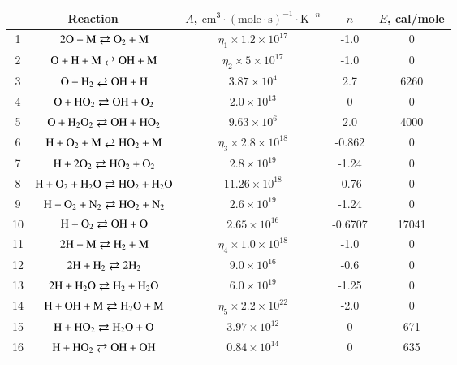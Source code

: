 \documentclass{warpdoc}
\renewcommand{\fontsizetable}{\footnotesize\scalefont{0.9}}
\begin{document}
%
\begin{table}[ht]
\fontsizetable
\begin{center}
\begin{threeparttable}
\begin{tabular}{ccccc} 
\toprule
\multicolumn{2}{c}{Reaction} & $A$, $\textrm{cm}^3\cdot(\textrm{mole}\cdot \textrm{s})^{-1}\cdot \textrm{K}^{-n}$ & $n$ & $E$, cal/mole  \\ 
\midrule
    1 & $\rm 2O + M \rightleftarrows  O_2 + M$&$ \eta_1 \times 1.2 \times 10^{17}$& -1.0 &  0\\
    2 & $\rm O +  H + M \rightleftarrows  OH + M$  & $ \eta_2 \times 5 \times 10^{17} $& -1.0 &  0\\
    3& $\rm O +  H_2  \rightleftarrows  OH + H$  & $ 3.87 \times 10^{4} $& 2.7 & 6260 \\
    4 & $\rm O +  HO_2  \rightleftarrows  OH + O_2$  & $ 2.0 \times 10^{13} $& 0 & 0 \\
    5 & $\rm O +  H_2O_2  \rightleftarrows  OH + HO_2$  & $ 9.63 \times 10^{6} $& 2.0 & 4000  \\
    6 & $\rm H + O_2 + M  \rightleftarrows  HO_2 + M$  & $ \eta_3 \times 2.8 \times 10^{18} $& -0.862 & 0 \\
    7 & $\rm H + 2O_2  \rightleftarrows  HO_2 + O_2$  & $ 2.8 \times 10^{19} $& -1.24 & 0 \\
    8 & $\rm H + O_2 + H_2O  \rightleftarrows  HO_2 + H_2O$  & $ 11.26 \times 10^{18} $& -0.76 & 0 \\
    9 & $\rm H + O_2 + N_2  \rightleftarrows  HO_2 + N_2$  & $ 2.6 \times 10^{19} $& -1.24 & 0 \\
    10 & $\rm H + O_2 \rightleftarrows  OH + O$  & $ 2.65 \times 10^{16} $& -0.6707 & 17041 \\
    11 & $\rm 2H + M \rightleftarrows  H_2 + M$  & $ \eta_4 \times 1.0 \times 10^{18} $& -1.0 & 0 \\
    12 & $\rm 2H + H_2 \rightleftarrows  2H_2 $  & $ 9.0 \times 10^{16} $& -0.6 & 0 \\
    13 & $\rm 2H + H_2O \rightleftarrows  H_2 + H_2O$  & $ 6.0 \times 10^{19} $& -1.25 & 0 \\
    14 & $\rm H + OH + M \rightleftarrows  H_2O + M$  & $ \eta_5 \times 2.2 \times 10^{22} $& -2.0 & 0 \\
    15 & $\rm H + HO_2 \rightleftarrows  H_2O + O$  & $ 3.97 \times 10^{12} $& 0 & 671 \\
    16 & $\rm H + HO_2 \rightleftarrows  OH + OH$  & $ 0.84 \times 10^{14} $& 0 & 635 \\

\end{tabular}
\end{threeparttable}
\end{center}
\end{table}
\end{document}
